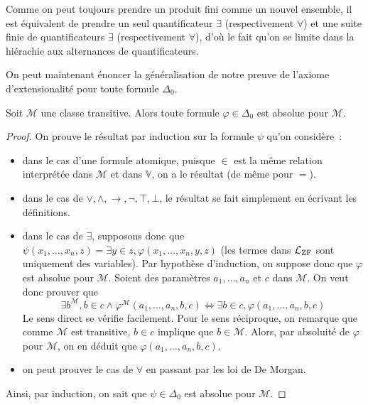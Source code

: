 \begin{remark}
  Comme on peut toujours prendre un produit fini comme un nouvel ensemble, il
  est équivalent de prendre un seul quantificateur $\exists$ (respectivement
  $\forall$) et une suite finie de quantificateurs $\exists$ (respectivement
  $\forall$), d'où le fait qu'on se limite dans la hiérachie aux alternances
  de quantificateurs.
\end{remark}

On peut maintenant énoncer la généralisation de notre preuve de l'axiome
d'extensionalité pour toute formule $\Delta_0$.

\begin{proposition}
  Soit $\mathcal M$ une classe transitive. Alors toute formule
  $\varphi\in\Delta_0$ est absolue pour $\mathcal M$.
\end{proposition}

\begin{proof}
  On prouve le résultat par induction sur la formule $\psi$ qu'on considère~:
  \begin{itemize}
  \item dans le cas d'une formule atomique, puisque $\in$ est la même relation
    interprétée dans $\mathcal M$ et dans $\mathbb V$, on a le résultat (de
    même pour $=$).
  \item dans le cas de $\lor,\land,\to,\lnot,\top,\bot$, le résultat se fait
    simplement en écrivant les définitions.
  \item dans le cas de $\exists$, supposons donc que
    $\psi(x_1,\ldots,x_n,z) = \exists y \in z,\varphi(x_1,\ldots,x_n,y,z)$
    (les termes dans $\mathcal L_{\operatorname{ZF}}$ sont uniquement des variables). Par
    hypothèse d'induction, on suppose donc que $\varphi$ est absolue pour
    $\mathcal M$. Soient des paramètres $a_1,\ldots,a_n$ et $c$ dans
    $\mathcal M$. On veut donc prouver que
    \[\exists b^{\mathcal M}, b \in c \land \varphi^{\mathcal M}(a_1,\ldots,a_n,b,c)
    \iff \exists b \in c, \varphi(a_1,\ldots,a_n,b,c)\]
    Le sens direct se vérifie facilement. Pour le sens réciproque, on
    remarque que comme $\mathcal M$ est transitive, $b \in c$ implique que
    $b \in \mathcal M$. Alors, par absoluité de $\varphi$ pour $\mathcal M$,
    on en déduit que $\varphi(a_1,\ldots,a_n,b,c)$.
  \item on peut prouver le cas de $\forall$ en passant par les loi de De Morgan.
  \end{itemize}
  Ainsi, par induction, on sait que $\psi \in \Delta_0$ est absolue pour
  $\mathcal M$.
\end{proof}

